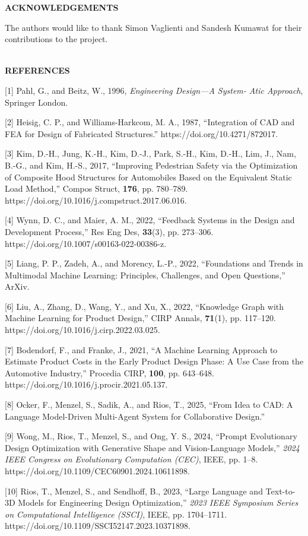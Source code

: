 \documentclass[11pt]{article}
\begin{document}
\textbf{ACKNOWLEDGEMENTS}

The authors would like to thank Simon Vaglienti and Sandesh Kumawat for
their contributions to the project.\\
\strut \\
\textbf{REFERENCES}

{[}1{]} Pahl, G., and Beitz, W., 1996, \emph{Engineering Design---A
System- Atic Approach}, Springer London.

{[}2{]} Heisig, C. P., and Williams-Harkcom, M. A., 1987, ``Integration
of CAD and FEA for Design of Fabricated Structures.''
https://doi.org/10.4271/872017.

{[}3{]} Kim, D.-H., Jung, K.-H., Kim, D.-J., Park, S.-H., Kim, D.-H.,
Lim, J., Nam, B.-G., and Kim, H.-S., 2017, ``Improving Pedestrian Safety
via the Optimization of Composite Hood Structures for Automobiles Based
on the Equivalent Static Load Method,'' Compos Struct, \textbf{176}, pp.
780--789. https://doi.org/10.1016/j.compstruct.2017.06.016.

{[}4{]} Wynn, D. C., and Maier, A. M., 2022, ``Feedback Systems in the
Design and Development Process,'' Res Eng Des, \textbf{33}(3), pp.
273--306. https://doi.org/10.1007/s00163-022-00386-z.

{[}5{]} Liang, P. P., Zadeh, A., and Morency, L.-P., 2022, ``Foundations
and Trends in Multimodal Machine Learning: Principles, Challenges, and
Open Questions,'' ArXiv.

{[}6{]} Liu, A., Zhang, D., Wang, Y., and Xu, X., 2022, ``Knowledge
Graph with Machine Learning for Product Design,'' CIRP Annals,
\textbf{71}(1), pp. 117--120.
https://doi.org/10.1016/j.cirp.2022.03.025.

{[}7{]} Bodendorf, F., and Franke, J., 2021, ``A Machine Learning
Approach to Estimate Product Costs in the Early Product Design Phase: A
Use Case from the Automotive Industry,'' Procedia CIRP, \textbf{100},
pp. 643--648. https://doi.org/10.1016/j.procir.2021.05.137.

{[}8{]} Ocker, F., Menzel, S., Sadik, A., and Rios, T., 2025, ``From
Idea to CAD: A Language Model-Driven Multi-Agent System for
Collaborative Design.''

{[}9{]} Wong, M., Rios, T., Menzel, S., and Ong, Y. S., 2024, ``Prompt
Evolutionary Design Optimization with Generative Shape and
Vision-Language Models,'' \emph{2024 IEEE Congress on Evolutionary
Computation (CEC)}, IEEE, pp. 1--8.
https://doi.org/10.1109/CEC60901.2024.10611898.

{[}10{]} Rios, T., Menzel, S., and Sendhoff, B., 2023, ``Large Language
and Text-to-3D Models for Engineering Design Optimization,'' \emph{2023
IEEE Symposium Series on Computational Intelligence (SSCI)}, IEEE, pp.
1704--1711. https://doi.org/10.1109/SSCI52147.2023.10371898.
\end{document}
